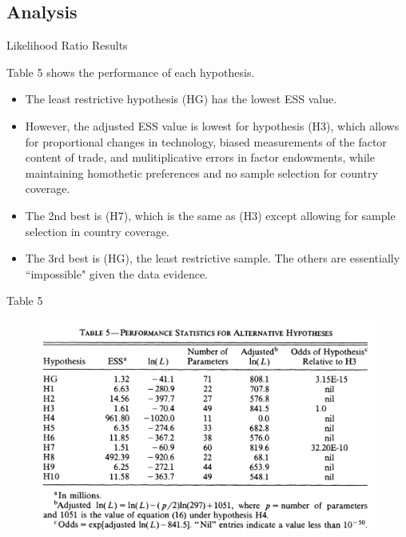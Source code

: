 \documentclass[aspectratio=169]{beamer}
\begin{document}

\subsection{Analysis}


\begin{frame}{Likelihood Ratio Results}

Table 5 shows the performance of each hypothesis.

\begin{itemize}
    \item<1-> The least restrictive hypothesis (HG) has the lowest ESS value.
    \item<2-> However, the adjusted ESS value is lowest for hypothesis (H3), which allows for proportional changes in technology, biased measurements of the factor content of trade, and mulitiplicative errors in factor endowments, while maintaining homothetic preferences and no sample selection for country coverage.
    \item<3-> The 2nd best is (H7), which is the same as (H3) except allowing for sample selection in country coverage.
    \item<4-> The 3rd best is (HG), the least restrictive sample.  The others are essentially ``impossible" given the data evidence.
\end{itemize}
    
\end{frame}


\begin{frame}{Table 5}

\begin{figure}
    \centering
    \includegraphics[scale = 1]{Table 5.png}
    \label{fig:Table5}
\end{figure} 
    
\end{frame}
\end{document}
